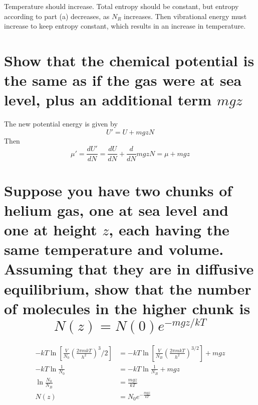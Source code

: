 \documentclass[answers]{exam}
\begin{document}
\begin{questions}
\begin{parts}
    \begin{solution}
        Temperature should increase. Total entropy should be constant, but entropy according to part (a) decreases, as $N_R$ increases. Then vibrational energy must increase to keep entropy constant, which results in an increase in temperature.
    \end{solution}

\end{parts}


\begin{parts}
    \part{Show that the chemical potential is the same as if the gas were at sea level, plus an additional term $mgz$}

    \begin{solution}
        The new potential energy is given by
        $$U' = U + mgzN$$
        Then
        $$\mu' = \frac{dU'}{dN} = \frac{dU}{dN} + \frac{d}{dN} mgzN = \mu + mgz$$
    \end{solution}

    \part{Suppose you have two chunks of helium gas, one at sea level and one at height $z$, each having the same temperature and volume. Assuming that they are in diffusive equilibrium, show that the number of molecules in the higher chunk is
    $$N(z) = N(0)e^{-mgz/kT}$$
}

    \begin{solution}
        \begin{align*}
            -kT\ln[\frac{V}{N_0}\left(\frac{2\pi mkT}{h^2}\right)^3/2] &= -kT\ln[\frac{V}{N_B}\left(\frac{2\pi mkT}{h^2}\right)^{3/2}] + mgz \\
            -kT\ln\frac{1}{N_0} &= -kT\ln\frac{1}{N_B} + mgz \\
            \ln\frac{N_0}{N_B} &= \frac{mgz}{kT} \\
            N(z) &= N_0 e^{-\frac{mgz}{kT}}
        \end{align*}
    \end{solution}
\end{parts}
\end{questions}
\end{document}
